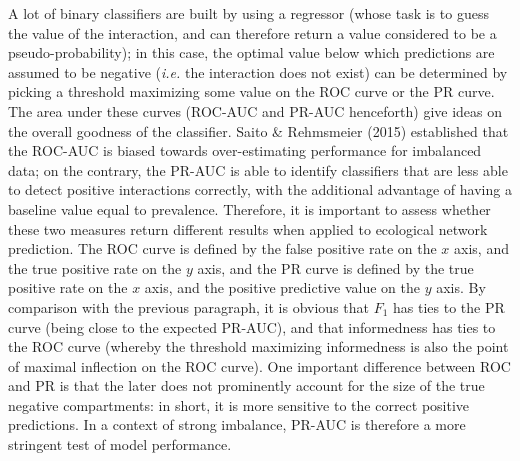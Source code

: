 \documentclass[11pt]{article}
\begin{document}
A lot of binary classifiers are built by using a regressor (whose task
is to guess the value of the interaction, and can therefore return a
value considered to be a pseudo-probability); in this case, the optimal
value below which predictions are assumed to be negative (\emph{i.e.}
the interaction does not exist) can be determined by picking a threshold
maximizing some value on the ROC curve or the PR curve. The area under
these curves (ROC-AUC and PR-AUC henceforth) give ideas on the overall
goodness of the classifier. Saito \& Rehmsmeier (2015) established that
the ROC-AUC is biased towards over-estimating performance for imbalanced
data; on the contrary, the PR-AUC is able to identify classifiers that
are less able to detect positive interactions correctly, with the
additional advantage of having a baseline value equal to prevalence.
Therefore, it is important to assess whether these two measures return
different results when applied to ecological network prediction. The ROC
curve is defined by the false positive rate on the \(x\) axis, and the
true positive rate on the \(y\) axis, and the PR curve is defined by the
true positive rate on the \(x\) axis, and the positive predictive value
on the \(y\) axis. By comparison with the previous paragraph, it is
obvious that \(F_1\) has ties to the PR curve (being close to the
expected PR-AUC), and that informedness has ties to the ROC curve
(whereby the threshold maximizing informedness is also the point of
maximal inflection on the ROC curve). One important difference between
ROC and PR is that the later does not prominently account for the size
of the true negative compartments: in short, it is more sensitive to the
correct positive predictions. In a context of strong imbalance, PR-AUC
is therefore a more stringent test of model performance.
\end{document}
